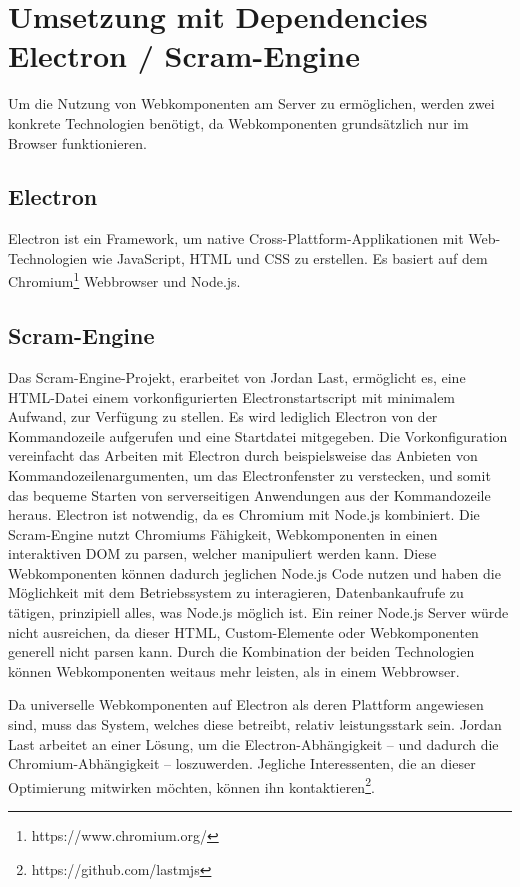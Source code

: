 \section{Umsetzung mit Dependencies Electron / Scram-Engine}
Um die Nutzung von Webkomponenten am Server zu ermöglichen, werden zwei konkrete Technologien benötigt, da Webkomponenten grundsätzlich nur im Browser funktionieren.
\subsection{Electron}
Electron ist ein Framework, um native Cross-Plattform-Applikationen mit Web-Technologien wie JavaScript, HTML und CSS zu erstellen. Es basiert auf dem Chromium\footnote{https://www.chromium.org/} Webbrowser und Node.js.
\subsection{Scram-Engine}
\label{cha:scram-engine}
Das Scram-Engine-Projekt, erarbeitet von Jordan Last, ermöglicht es, eine HTML-Datei einem vorkonfigurierten Electronstartscript mit minimalem Aufwand, zur Verfügung zu stellen. Es wird lediglich Electron von der Kommandozeile aufgerufen und eine Startdatei mitgegeben. Die Vorkonfiguration vereinfacht das Arbeiten mit Electron durch beispielsweise das Anbieten von Kommandozeilenargumenten, um das Electronfenster zu verstecken, und somit das bequeme Starten von serverseitigen Anwendungen aus der Kommandozeile heraus.
Electron ist notwendig, da es Chromium mit Node.js kombiniert. Die Scram-Engine nutzt Chromiums Fähigkeit, Webkomponenten in einen interaktiven DOM zu parsen, welcher manipuliert werden kann. Diese Webkomponenten können dadurch jeglichen Node.js Code nutzen und haben die Möglichkeit mit dem Betriebssystem zu interagieren, Datenbankaufrufe zu tätigen, prinzipiell alles, was Node.js möglich ist.
Ein reiner Node.js Server würde nicht ausreichen, da dieser HTML, Custom-Elemente oder Webkomponenten generell nicht parsen kann.
Durch die Kombination der beiden Technologien können Webkomponenten weitaus mehr leisten, als in einem Webbrowser.

Da universelle Webkomponenten auf Electron als deren Plattform angewiesen sind, muss das System, welches diese betreibt, relativ leistungsstark sein. Jordan Last arbeitet an einer Lösung, um die Electron-Abhängigkeit -- und dadurch die Chromium-Abhängigkeit -- loszuwerden. Jegliche Interessenten, die an dieser Optimierung mitwirken möchten, können ihn kontaktieren\footnote{https://github.com/lastmjs}.

